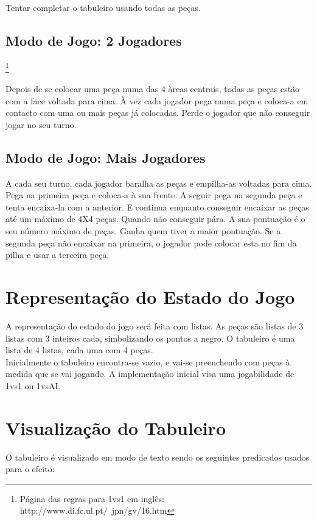 \documentclass[a4paper]{article}
\begin{document}
Tentar completar o tabuleiro usando todas as peças.

\subsection{Modo de Jogo: 2 Jogadores}
\footnote{Página das regras para 1vs1 em inglês: http://www.di.fc.ul.pt/~jpn/gv/16.htm}

Depois de se colocar uma peça numa das 4 àreas centrais, todas as peças estão com a face voltada para cima. À vez cada jogador pega numa peça e coloca-a em contacto com uma ou mais peças já colocadas. Perde o jogador que não conseguir jogar no seu turno.

\subsection{Modo de Jogo: Mais Jogadores}

A cada seu turno, cada jogador baralha as peças e empilha-as voltadas para cima. Pega na primeira peça e coloca-a à sua frente. A seguir pega na segunda peça e tenta encaixa-la com a anterior. E continua enquanto conseguir encaixar as peças até um máximo de 4X4 peças. Quando não conseguir pára. A sua pontuação é o seu número máximo de peças. Ganha quem tiver a maior pontuação. Se a segunda peça não encaixar na primeira, o jogador pode colocar esta no fim da pilha e usar a terceira peça.

\section{Representação do Estado do Jogo}

A representação do estado do jogo será feita com listas. As peças são listas de 3 listas com 3 inteiros cada, simbolizando os pontos a negro. O tabuleiro é uma lista de 4 listas, cada uma com 4 peças.
\\
\indent 
Inicialmente o tabuleiro encontra-se vazio, e vai-se preenchendo com peças à medida que se vai jogando. A implementação inicial visa uma jogabilidade de 1vs1 ou 1vsAI.

\section{Visualização do Tabuleiro}

O tabuleiro é visualizado em modo de texto sendo os seguintes predicados usados para o efeito:
\end{document}
